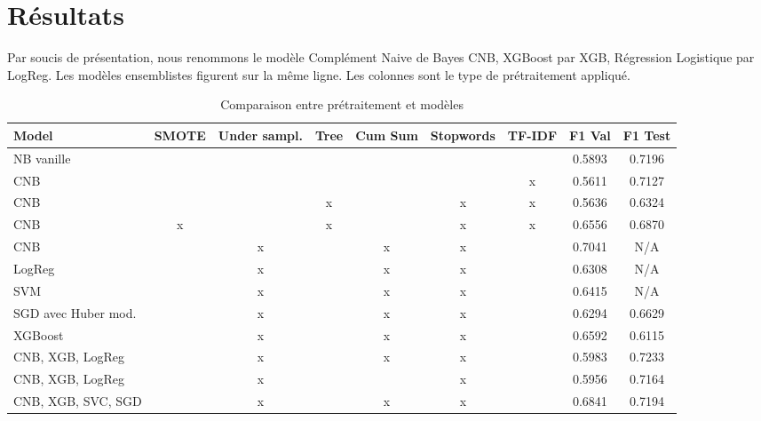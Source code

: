 \documentclass{article}
\begin{document}
\section{Résultats}
Par soucis de présentation, nous renommons le modèle Complément Naive de Bayes CNB, XGBoost par XGB, Régression Logistique par LogReg. Les modèles ensemblistes figurent sur la même ligne. Les colonnes sont le type de prétraitement appliqué.
\begin{table}[H]
    \centering
    \begin{tabular}{|l|c|c|c|c|c|c|c|c|}
        \hline
        \textbf{Model} & \textbf{SMOTE} & \textbf{Under sampl.} & \textbf{Tree} &
        \textbf{Cum Sum} & \textbf{Stopwords} & \textbf{TF-IDF} &
        \textbf{F1 Val} & 
        \textbf{F1 Test} \\
        \hline
        NB vanille &  &  &  &  &  &  & 0.5893 & 0.7196\\
        CNB &  &  &  &  &  & x & 0.5611 & 0.7127\\
        CNB &  &  & x &  & x & x & 0.5636 & 0.6324\\
        CNB & x &  & x &  & x & x & 0.6556 & 0.6870\\
        CNB &  & x &  & x & x &  & 0.7041 & N/A\\
        LogReg &  & x &  & x & x &  & 0.6308 & N/A\\
        SVM &  & x &  & x & x &  & 0.6415 & N/A\\
        SGD avec Huber mod. &  & x &  & x & x &  & 0.6294 & 0.6629\\
        XGBoost &  & x &  & x & x &  & 0.6592 & 0.6115\\
        CNB, XGB, LogReg &  & x &  & x & x &  & 0.5983 & 0.7233\\
        CNB, XGB, LogReg &  & x &  &  & x &  & 0.5956 & 0.7164\\
        CNB, XGB, SVC, SGD &  & x &  & x & x &  & 0.6841 & 0.7194\\
        \hline
    \end{tabular}
    \caption{Comparaison entre prétraitement et modèles}
    \label{tab:model_comparison}
\end{table}
\end{document}
